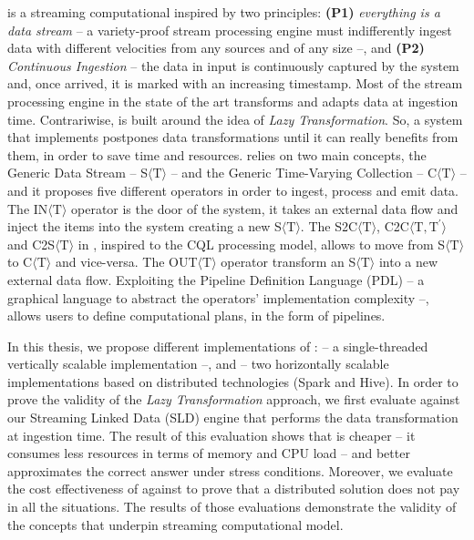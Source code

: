 \river{} is a streaming computational inspired by two principles: \textbf{(P1)} \textit{everything is a data stream} -- a variety-proof stream processing engine must indifferently ingest data with different velocities from any sources and of any size --, and \textbf{(P2)} \textit{Continuous Ingestion} -- the data in input is continuously captured by the system and, once arrived, it is marked with an increasing timestamp.
Most of the stream processing engine in the state of the art transforms and adapts data at ingestion time.
Contrariwise, \river{} is built around the idea of \textit{Lazy Transformation}.
So, a system that implements \river{} postpones data transformations until it can really benefits from them, in order to save time and resources.
\river{} relies on two main concepts, the Generic Data Stream -- S$\langle\mathrm{T}\rangle$ -- and the Generic Time-Varying Collection -- C$\langle\mathrm{T}\rangle$ -- and it proposes five different operators in order to ingest, process and emit data.
The IN$\langle\mathrm{T}\rangle$ operator is the door of the system, it takes an external data flow and inject the items into the system creating a new S$\langle\mathrm{T}\rangle$.
The S2C$\langle\mathrm{T}\rangle$, C2C$\langle\mathrm{T},\mathrm{T^{\prime}}\rangle$ and C2S$\langle\mathrm{T}\rangle$ in \river{}, inspired to the CQL processing model, allows to move from S$\langle\mathrm{T}\rangle$ to C$\langle\mathrm{T}\rangle$ and vice-versa.
The OUT$\langle\mathrm{T}\rangle$ operator transform an S$\langle\mathrm{T}\rangle$ into a new external data flow.
Exploiting the Pipeline Definition Language (PDL) -- a graphical language to abstract the operators' implementation complexity --, \river{} allows users to define computational plans, in the form of pipelines.

In this thesis, we propose different implementations of \river{}: \sti{} -- a single-threaded vertically scalable implementation --, \sparkdi{} and \hivedi{} -- two horizontally scalable implementations based on distributed technologies (Spark and Hive).
In order to prove the validity of the \textit{Lazy Transformation} approach, we first evaluate \sti{} against our Streaming Linked Data (SLD) engine that performs the data transformation at ingestion time. The result of this evaluation shows that \sti{} is cheaper -- it consumes less resources in terms of memory and CPU load -- and better approximates the correct answer under stress conditions.
Moreover, we evaluate the cost effectiveness of \sti{} against \sparkdi{} to prove that a distributed solution does not pay in all the situations.
The results of those evaluations demonstrate the validity of the concepts that underpin \river{} streaming computational model.

